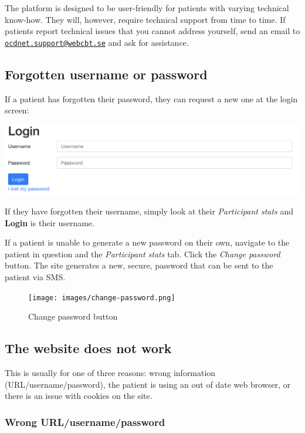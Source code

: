 \documentclass[]{book}
\theoremstyle{definition}
\theoremstyle{definition}
\theoremstyle{definition}
\theoremstyle{remark}
\begin{document}
The platform is designed to be user-friendly for patients with varying
technical know-how. They will, however, require technical support from
time to time. If patients report technical issues that you cannot
address yourself, send an email to
\href{mailto:ocdnet.support@webcbt.se}{\nolinkurl{ocdnet.support@webcbt.se}}
and ask for assistance.

\hypertarget{forgotten-username-or-password}{%
\subsection{Forgotten username or
password}\label{forgotten-username-or-password}}

If a patient has forgotten their password, they can request a new one at
the login screen:

\includegraphics{images/patient-login.png}

If they have forgotten their username, simply look at their
\emph{Participant stats} and \textbf{Login} is their username.

If a patient is unable to generate a new password on their own, navigate
to the patient in question and the \emph{Participant stats} tab. Click
the \emph{Change password} button. The site generates a new, secure,
password that can be sent to the patient via SMS.

\begin{figure}
\centering
\texttt{[image: images/change-password.png]}
\caption{Change password button}
\end{figure}

\hypertarget{the-website-does-not-work}{%
\subsection{The website does not work}\label{the-website-does-not-work}}

This is usually for one of three reasons: wrong information
(URL/username/password), the patient is using an out of date web
browser, or there is an issue with cookies on the site.

\hypertarget{wrong-urlusernamepassword}{%
\subsubsection{Wrong
URL/username/password}\label{wrong-urlusernamepassword}}
\end{document}
